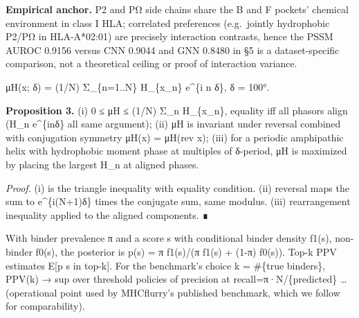 \textbf{Empirical anchor.} P2 and PΩ side chains share the B and F pockets' chemical environment in class I HLA; correlated preferences (e.g.~jointly hydrophobic P2/PΩ in HLA-A*02:01) are precisely interaction contrasts, hence the PSSM AUROC 0.9156 versus CNN 0.9044 and GNN 0.8480 in §5 is a dataset-specific comparison, not a theoretical ceiling or proof of interaction variance.


μH(x; δ) = (1/N) \textbar Σ\_\{n=1..N\} H\_\{x\_n\} e\^{}\{i n δ\}\textbar, δ = 100°.

\textbf{Proposition 3.} (i) 0 ≤ μH ≤ (1/N) Σ\_n \textbar H\_\{x\_n\}\textbar, equality iff all phasors align (H\_n e\^{}\{inδ\} all same argument); (ii) μH is invariant under reversal combined with conjugation symmetry \textbar μH(x)\textbar{} = \textbar μH(rev x)\textbar; (iii) for a periodic amphipathic helix with hydrophobic moment phase at multiples of δ-period, μH is maximized by placing the largest \textbar H\_n\textbar{} at aligned phases.

\emph{Proof.} (i) is the triangle inequality with equality condition. (ii) reversal maps the sum to e\^{}\{i(N+1)δ\} times the conjugate sum, same modulus. (iii) rearrangement inequality applied to the aligned components. ∎


With binder prevalence π and a score s with conditional binder density f1(s), non-binder f0(s), the posterior is p(s) = π f1(s)/(π f1(s) + (1-π) f0(s)). Top-k PPV estimates E{[}p \textbar{} s in top-k{]}. For the benchmark's choice k = \#\{true binders\}, PPV(k) → sup over threshold policies of precision at recall=π·N/\textbar\{predicted\}\textbar{} \ldots{} (operational point used by MHCflurry's published benchmark, which we follow for comparability).


